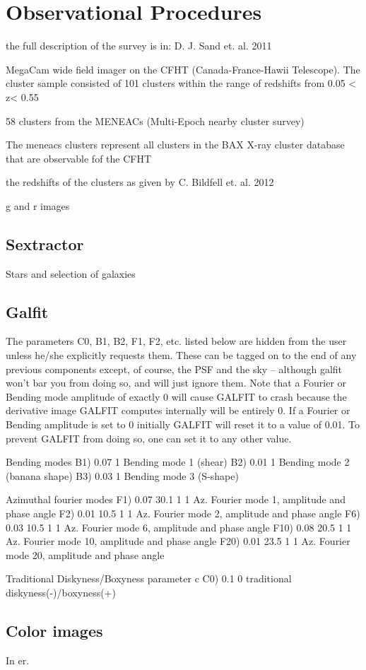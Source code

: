 
\chapter{Observational Procedures}

the full description of the survey is in: D. J. Sand et. al. 2011

MegaCam wide field imager on the CFHT (Canada-France-Hawii Telescope). The cluster sample consisted of 101 clusters within the range of redshifts from 0.05 < z< 0.55

58 clusters from the MENEACs (Multi-Epoch nearby cluster survey)

The meneacs clusters represent all clusters in the BAX X-ray cluster database that are observable fof the CFHT

the redshifts of the clusters as given by C. Bildfell et. al. 2012 

g and r images

\section{Sextractor}

Stars and selection of galaxies

\section{Galfit}

 The parameters C0, B1, B2, F1, F2, etc. listed below are hidden 
 from the user unless he/she explicitly requests them.  These can  be tagged on to the end of any previous components except, of 
 course, the PSF and the sky -- although galfit won't bar you from doing 
 so, and will just ignore them.  Note that a Fourier or Bending mode 
 amplitude of exactly 0 will cause GALFIT to crash because the 
 derivative image GALFIT computes internally will be entirely 0.  If a 
 Fourier or Bending amplitude is set to 0 initially GALFIT will reset it  
 to a value of 0.01.  To prevent GALFIT from doing so, one can set it to any 
 other value.

  Bending modes
B1)  0.07      1        Bending mode 1 (shear)
B2)  0.01      1        Bending mode 2 (banana shape)
B3)  0.03      1        Bending mode 3 (S-shape)

  Azimuthal fourier modes
F1)  0.07  30.1  1  1   Az. Fourier mode 1, amplitude and phase angle
F2)  0.01  10.5  1  1   Az. Fourier mode 2, amplitude and phase angle
F6)  0.03  10.5  1  1  Az. Fourier mode 6, amplitude and phase angle
F10)  0.08  20.5  1  1   Az. Fourier mode 10, amplitude and phase angle
F20)  0.01  23.5  1  1   Az. Fourier mode 20, amplitude and phase angle

  Traditional Diskyness/Boxyness parameter c
C0) 0.1         0       traditional diskyness(-)/boxyness(+)

\section{Color images}


In er.  